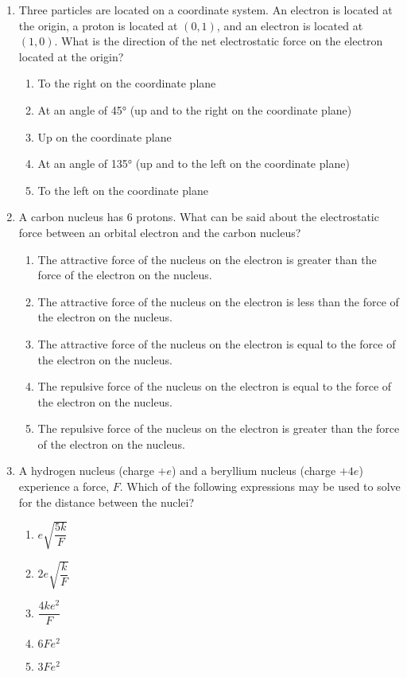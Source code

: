 \documentclass{../../../oss-classkick}
\begin{document}
\begin{multicols*}{2}
\begin{enumerate}[leftmargin=18pt]
   \item Three particles are located on a coordinate system. An electron is
     located at the origin, a proton is located at $(0,1)$, and an electron is
     located at $(1,0)$. What is the direction of the net electrostatic force on
     the electron located at the origin?
     \begin{enumerate}[nosep,leftmargin=18pt,label=(\Alph*)]
     \item To the right on the coordinate plane
     \item At an angle of \ang{45} (up and to the right on the coordinate plane)
     \item Up on the coordinate plane
     \item At an angle of \ang{135} (up and to the left on the coordinate plane)
     \item To the left on the coordinate plane
     \end{enumerate}
     \vspace{.7in}
     
   \item A carbon nucleus has 6 protons. What can be said about the
     electrostatic force between an orbital electron and the carbon nucleus?
     \begin{enumerate}[nosep,leftmargin=18pt,label=(\Alph*)]
     \item The attractive force of the nucleus on the electron is greater than
       the force of the electron on the nucleus.
     \item The attractive force of the nucleus on the electron is less than the
       force of the electron on the nucleus.
     \item The attractive force of the nucleus on the electron is equal to the
       force of the electron on the nucleus.
     \item The repulsive force of the nucleus on the electron is equal to the
       force of the electron on the nucleus.
     \item The repulsive force of the nucleus on the electron is greater than
       the force of the electron on the nucleus.
     \end{enumerate}
     \vspace{.7in}
     
   \item A hydrogen nucleus (charge $+e$) and a beryllium nucleus (charge $+4e$)
     experience a force, $F$. Which of the following expressions may be used
     to solve for the distance between the nuclei?
     \begin{enumerate}[itemsep=4.5pt,leftmargin=18pt,label=(\Alph*)]
     \item$e\sqrt{\dfrac{5k}F}$
     \item$2e\sqrt{\dfrac{k}F}$
     \item$\dfrac{4ke^2}F$
     \item$6Fe^2$
     \item$3Fe^2$
     \end{enumerate}
     \vspace{.7in}
     

\end{enumerate}
\end{multicols*}
\end{document}
